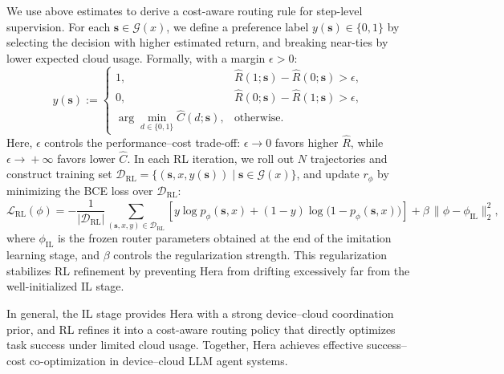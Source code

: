 \documentclass{article}
\newcommand{\name}{Hera\xspace}
\begin{document}
We use above estimates to derive a cost-aware routing rule for step-level supervision.
For each $\mathbf{s}\in\mathcal{G}(x)$, we define a preference label $y(\mathbf{s})\in\{0,1\}$ by selecting the decision with higher estimated return, and breaking near-ties by lower expected cloud usage.
Formally, with a margin $\epsilon>0$:
\begin{equation}
y(\mathbf{s}) :=
\begin{cases}
1, & \widehat{R}(1;\mathbf{s}) - \widehat{R}(0;\mathbf{s}) > \epsilon,\\
0, & \widehat{R}(0;\mathbf{s}) - \widehat{R}(1;\mathbf{s}) > \epsilon,\\
\arg\min\limits_{d\in\{0,1\}} \widehat{C}(d;\mathbf{s}), & \text{otherwise}.
\end{cases}
\label{eq:rl_label_rule}
\end{equation}
Here, $\epsilon$ controls the performance--cost trade-off: $\epsilon\!\to\!0$ favors higher $\widehat{R}$, while $\epsilon\!\to\!+\infty$ favors lower $\widehat{C}$.
In each RL iteration, we roll out $N$ trajectories and construct training set $\mathcal{D}_{\mathrm{RL}}=\{(\mathbf{s},x,y(\mathbf{s})) \mid \mathbf{s}\in\mathcal{G}(x)\}$, and update $r_{\phi}$  by minimizing the BCE loss over $\mathcal{D}_{\mathrm{RL}}$:
\begin{equation}
\mathcal{L}_{\mathrm{RL}}(\phi)
=
-
\frac{1}{|\mathcal{D}_{\mathrm{RL}}|}
\sum_{(\mathbf{s},x,y)\in\mathcal{D}_{\mathrm{RL}}}
\left[
y \log p_{\phi}(\mathbf{s},x)
+
(1-y)\log\big(1-p_{\phi}(\mathbf{s},x)\big)
\right]
+
\beta \, \|\phi-\phi_{\mathrm{IL}}\|_2^2,
\label{eq:rl_loss}
\end{equation}
where $\phi_{\mathrm{IL}}$ is the frozen router parameters obtained at the end of the imitation learning stage, and $\beta$ controls the regularization strength. This regularization stabilizes RL refinement by preventing \name from drifting excessively far from the well-initialized IL stage.

In general, the IL stage provides \name with a strong device--cloud coordination prior, and RL refines it into a cost-aware routing policy that directly optimizes task success under limited cloud usage. Together, \name achieves effective success--cost co-optimization in device--cloud LLM agent systems.
\end{document}
